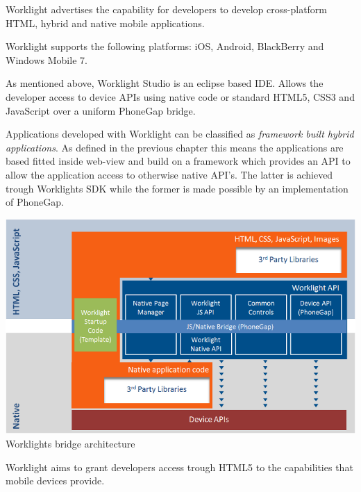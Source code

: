 Worklight advertises the capability for developers to develop cross-platform HTML, hybrid and native mobile applications.


Worklight supports the following platforms: iOS, Android, BlackBerry and Windows Mobile 7.

As mentioned above, Worklight Studio is an eclipse based IDE.
Allows the developer access to device APIs using native code or standard HTML5, CSS3 and JavaScript over a uniform PhoneGap bridge.


Applications developed with Worklight can be classified as \emph{framework built hybrid applications}. As defined in the previous chapter this means the applications are based fitted inside web-view and build on a framework which provides an API to allow the application access to otherwise native API's. The latter is achieved trough Worklights SDK while the former is made possible by an implementation of PhoneGap. \cite{Inc2012}

\begin{centering}
	\includegraphics[scale=0.5]{images/Worklight_architecture.png}\\{Worklights bridge architecture\cite{Inc2012a}}\\
\end{centering}

Worklight aims to grant developers access trough HTML5 to the capabilities that mobile devices provide. 




